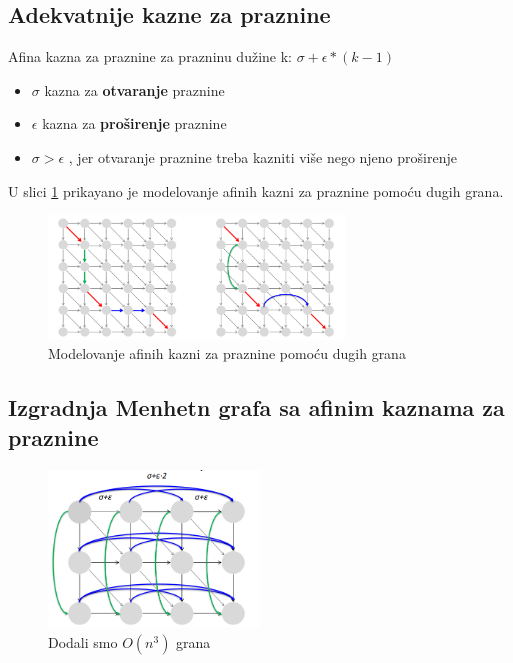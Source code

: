 \subsection{Adekvatnije kazne za praznine}

Afina kazna za praznine za prazninu dužine k:  \textbf{$\sigma+\epsilon*(k-1)$}
\begin{itemize}
    \item $\sigma$ kazna za \textbf{otvaranje} praznine
    \item $\epsilon$ kazna za \textbf{proširenje} praznine
    \item $ \sigma > \epsilon$ , jer otvaranje praznine treba kazniti više nego njeno proširenje
\end{itemize}



U slici \ref{slika:modelovanje} prikayano je modelovanje afinih kazni za praznine pomoću dugih grana.

\begin{figure}[]
\centering
\includegraphics[width=0.7\textwidth]{poglavlja/5/slike/modelovanjePomocuDugihGrana.png}
\caption{Modelovanje afinih kazni za praznine pomoću dugih grana}
\label{slika:modelovanje}
\end{figure}

\subsection{Izgradnja Menhetn grafa sa afinim kaznama za praznine}

\begin{figure}[]
\centering
\includegraphics[width=0.5\textwidth]{poglavlja/5/slike/MenhettnAifnePraznine.png}
\caption{Dodali smo $O(n^3)$ grana}
\label{slika:afiniMenhetn}
\end{figure}


